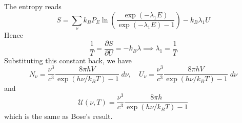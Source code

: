 \documentclass[../../../Main.tex]{subfiles}
\begin{document}
The entropy reads
\begin{equation*}
    S=\sum_\nu k_B P_E \ln\left(\frac{\exp(-\lambda_1E)}{\exp(-\lambda_1E)-1}\right)-k_B\lambda_1 U
\end{equation*}
Hence 
\begin{equation*}
    \frac{1}{T}=\frac{\partial S}{\partial U}=-k_B\lambda\implies \lambda_1=\frac{1}{T}
\end{equation*}
Substituting this constant back, we have
\begin{equation*}
    N_\nu=\frac{\nu^3}{c^3}\frac{8\pi h V}{\exp(h\nu/k_BT)-1}\;d\nu,\quad     U_\nu=\frac{\nu^3}{c^3}\frac{8\pi h V}{\exp(h\nu/k_BT)-1}\;d\nu 
\end{equation*}
and
\begin{equation*}
    \mathcal{U}(\nu,T) =\frac{\nu^3}{c^3}\frac{8\pi h}{\exp(h\nu/k_BT)-1}
\end{equation*}
which is the same as Bose's result.
\end{document}

